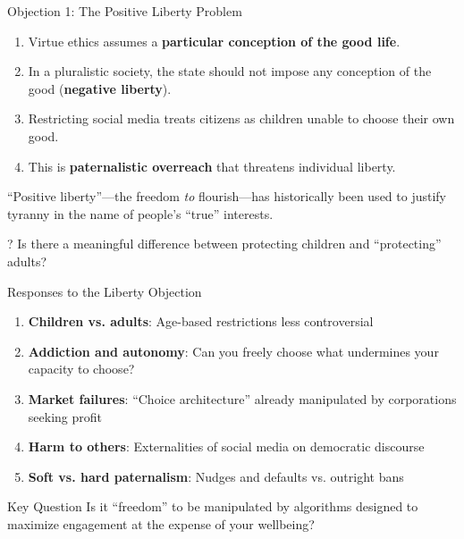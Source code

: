 \documentclass[aspectratio=169]{beamer}
\begin{document}
\begin{frame}{Objection 1: The Positive Liberty Problem}
\begin{objectionbox}
\small
\begin{enumerate}
    \item Virtue ethics assumes a \textbf{particular conception of the good life}.
    \item In a pluralistic society, the state should not impose any conception of the good (\textbf{negative liberty}).
    \item Restricting social media treats citizens as children unable to choose their own good.
    \item[\textbf{C.}] This is \textbf{paternalistic overreach} that threatens individual liberty.
\end{enumerate}
\end{objectionbox}

\begin{quotebox}
\small ``Positive liberty''---the freedom \textit{to} flourish---has historically been used to justify tyranny in the name of people's ``true'' interests.
\end{quotebox}

\begin{alertblock}{?}
Is there a meaningful difference between protecting children and ``protecting'' adults?
\end{alertblock}
\end{frame}

\begin{frame}{Responses to the Liberty Objection}
\begin{enumerate}
    \item \textbf{Children vs. adults}: Age-based restrictions less controversial
    
    \item \textbf{Addiction and autonomy}: Can you freely choose what undermines your capacity to choose?
    
    \item \textbf{Market failures}: ``Choice architecture'' already manipulated by corporations seeking profit
    
    \item \textbf{Harm to others}: Externalities of social media on democratic discourse
    
    \item \textbf{Soft vs. hard paternalism}: Nudges and defaults vs. outright bans
\end{enumerate}

\vspace{0.3cm}
\begin{alertblock}{Key Question}
Is it ``freedom'' to be manipulated by algorithms designed to maximize engagement at the expense of your wellbeing?
\end{alertblock}
\end{frame}
\end{document}

